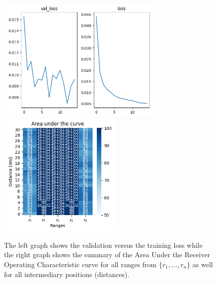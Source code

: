 \begin{multicols}{2}
\end{multicols}\begin{figure}[H]%
\centering
\includegraphics[width=8cm,height=6cm]{3_models/models_4/graph_4.png}
\hspace{0.2 cm}
\includegraphics[width=6cm,height=6cm]{4_plots/plots_4/AUC_4.png}
\caption{The left graph shows the validation versus the training loss while the right graph shows the summary of the Area Under the Receiver Operating Characteristic curve for all ranges from $\{r_{1}, ... ,r_{n}\}$ as well for all intermediary positions (distances).}
\label{auc_7}
\end{figure}

\newpage
